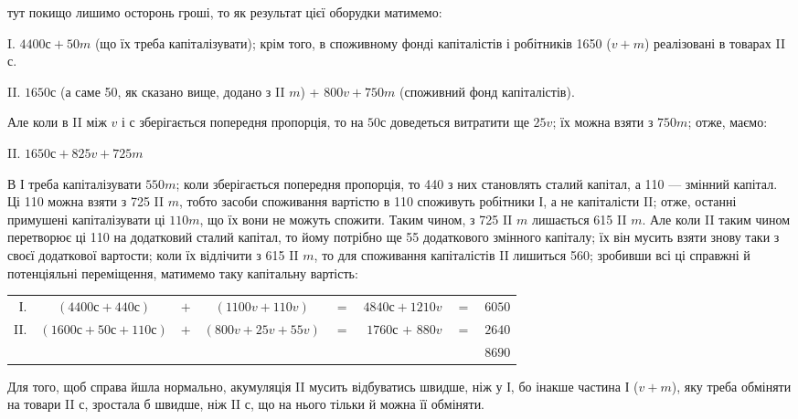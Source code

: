 \parcont{}  %
тут покищо лишимо осторонь гроші, то як результат цієї оборудки
матимемо:

I.    $4400 с + 50 m$ (що їх треба капіталізувати); крім того, в споживному
фонді капіталістів і робітників 1650 ($v + m$) реалізовані в
товарах II $с$.

II.    $1650 с$ (а саме 50, як сказано вище, додано з II $m$) + $800 v +
750 m$ (споживний фонд капіталістів).

Але коли в II між $v$ і $с$ зберігається попередня пропорція, то на $50 с$
доведеться витратити ще $25 v$; їх можна взяти з $750 m$; отже, маємо:

\begin{center}
II. $1650 с + 825 v + 725 m$
\end{center}

В І треба капіталізувати $550 m$; коли зберігається попередня пропорція,
то 440 з них становлять сталий капітал, а 110 — змінний капітал.
Ці 110 можна взяти з 725 II $m$, тобто засоби споживання вартістю в
110 споживуть робітники І, а не капіталісти II; отже, останні примушені
капіталізувати ці $110 m$, що їх вони не можуть спожити. Таким чином,
з 725 II $m$ лишається 615 II $m$. Але коли II таким чином перетворює
ці 110 на додатковий сталий капітал, то йому потрібно ще 55 додаткового
змінного капіталу; їх він мусить взяти знову таки з своєї додаткової
вартости; коли їх відлічити з 615 II $m$, то для споживання капіталістів II
лишиться 560; зробивши всі ці справжні й потенціяльні переміщення,
матимемо таку капітальну вартість:

\begin{table}[h]
  \begin{center}
  \begin{tabular}{r@{ } c@{ } c@{ } c@{ } r@{ } r@{ } r@{ } r@{ }}
  І. & $(4400 с + 440 с)$ & $+$ & $(1100v + 110 v)$ & $=$ & $4840 с + 1210 v$ & $=$ & $6050$ \\

II. & $(1600 с + 50 с + 110 с)$ & $+$ & $(800 v + 25 v + 55 v)$ & $=$ & $1760 с$ $+$ \phantom{0}$880 v$ & $=$ & $2640$ \\
    \cmidrule(){6-8}
    &                         &   &                       &   &                &   & $8690$
  \end{tabular}
  \end{center}
\end{table}
Для того, щоб справа йшла нормально, акумуляція II мусить відбуватись
швидше, ніж у І, бо інакше частина І ($v + m$), яку треба обміняти
на товари II $с$, зростала б швидше, ніж II $с$, що на нього тільки й можна
її обміняти.


